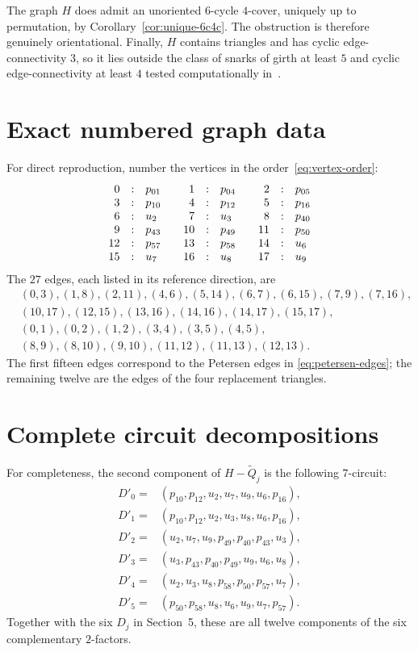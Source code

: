 \documentclass[11pt]{article}
\theoremstyle{definition}
\begin{document}
The graph $H$ does admit an unoriented $6$-cycle $4$-cover, uniquely up to
permutation, by Corollary~\ref{cor:unique-6c4c}.  The obstruction is therefore
genuinely orientational.  Finally, $H$ contains triangles and has cyclic
edge-connectivity $3$, so it lies outside the class of snarks of girth at
least $5$ and cyclic edge-connectivity at least $4$ tested computationally
in~\cite[Section~2.3]{Ulyanov}.

\appendix
\section{Exact numbered graph data}\label{app:data}

For direct reproduction, number the vertices in the
order~\eqref{eq:vertex-order}:
\[
\begin{array}{rcl@{\qquad}rcl@{\qquad}rcl}
0&:&p_{01} & 1&:&p_{04} & 2&:&p_{05}\\
3&:&p_{10} & 4&:&p_{12} & 5&:&p_{16}\\
6&:&u_2     & 7&:&u_3     & 8&:&p_{40}\\
9&:&p_{43} &10&:&p_{49}  &11&:&p_{50}\\
12&:&p_{57}&13&:&p_{58}  &14&:&u_6\\
15&:&u_7   &16&:&u_8     &17&:&u_9
\end{array}
\]
The $27$ edges, each listed in its reference direction, are
\begin{align*}
&(0,3),(1,8),(2,11),(4,6),(5,14),(6,7),(6,15),(7,9),(7,16),\\
&(10,17),(12,15),(13,16),(14,16),(14,17),(15,17),\\
&(0,1),(0,2),(1,2),(3,4),(3,5),(4,5),\\
&(8,9),(8,10),(9,10),(11,12),(11,13),(12,13).
\end{align*}
The first fifteen edges correspond to the Petersen edges in
\eqref{eq:petersen-edges}; the remaining twelve are the edges of the four
replacement triangles.

\section{Complete circuit decompositions}\label{app:components}

For completeness, the second component of $H-\widetilde Q_j$ is the following
$7$-circuit:
\begin{align*}
D'_0={}&(p_{10},p_{12},u_2,u_7,u_9,u_6,p_{16}),\\
D'_1={}&(p_{10},p_{12},u_2,u_3,u_8,u_6,p_{16}),\\
D'_2={}&(u_2,u_7,u_9,p_{49},p_{40},p_{43},u_3),\\
D'_3={}&(u_3,p_{43},p_{40},p_{49},u_9,u_6,u_8),\\
D'_4={}&(u_2,u_3,u_8,p_{58},p_{50},p_{57},u_7),\\
D'_5={}&(p_{50},p_{58},u_8,u_6,u_9,u_7,p_{57}).
\end{align*}
Together with the six $D_j$ in Section~5, these are all twelve components of
the six complementary $2$-factors.
\end{document}
